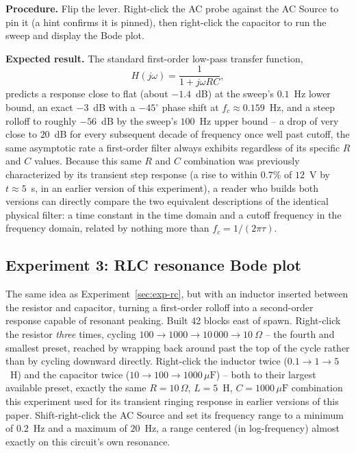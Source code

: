 \textbf{Procedure.} Flip the lever. Right-click the AC probe against the AC Source to pin it
(a hint confirms it is pinned), then right-click the capacitor to run the sweep and display
the Bode plot.

\textbf{Expected result.} The standard first-order low-pass transfer function,
\begin{equation}
H(j\omega) = \frac{1}{1 + j\omega RC},
\end{equation}
predicts a response close to flat (about $-1.4$~dB) at the sweep's $0.1$~Hz lower bound, an
exact $-3$~dB with a $-45^\circ$ phase shift at $f_c \approx 0.159$~Hz, and a steep rolloff to
roughly $-56$~dB by the sweep's $100$~Hz upper bound -- a drop of very close to $20$~dB for
every subsequent decade of frequency once well past cutoff, the same asymptotic rate a
first-order filter always exhibits regardless of its specific $R$ and $C$ values. Because
this same $R$ and $C$ combination was previously characterized by its transient step response
(a rise to within $0.7\%$ of $12$~V by $t \approx 5$~s, in an earlier version of this
experiment), a reader who builds both versions can directly compare the two equivalent
descriptions of the identical physical filter: a time constant in the time domain and a
cutoff frequency in the frequency domain, related by nothing more than
$f_c = 1/(2\pi\tau)$.

\subsection{Experiment 3: RLC resonance Bode plot}
\label{sec:exp-rlc}

The same idea as Experiment~\ref{sec:exp-rc}, but with an inductor inserted between the
resistor and capacitor, turning a first-order rolloff into a second-order response capable of
resonant peaking. Built 42 blocks east of spawn. Right-click the resistor \emph{three} times,
cycling $100 \to 1000 \to 10\,000 \to 10~\Omega$ -- the fourth and smallest preset, reached
by wrapping back around past the top of the cycle rather than by cycling downward directly.
Right-click the inductor twice ($0.1 \to 1 \to 5$~H) and the capacitor twice
($10 \to 100 \to 1000\,\mu\text{F}$) -- both to their largest available preset, exactly the
same $R=10\,\Omega$, $L=5$~H, $C=1000\,\mu\text{F}$ combination this experiment used for its
transient ringing response in earlier versions of this paper. Shift-right-click the AC
Source and set its frequency range to a minimum of $0.2$~Hz and a maximum of $20$~Hz, a range
centered (in log-frequency) almost exactly on this circuit's own resonance.

